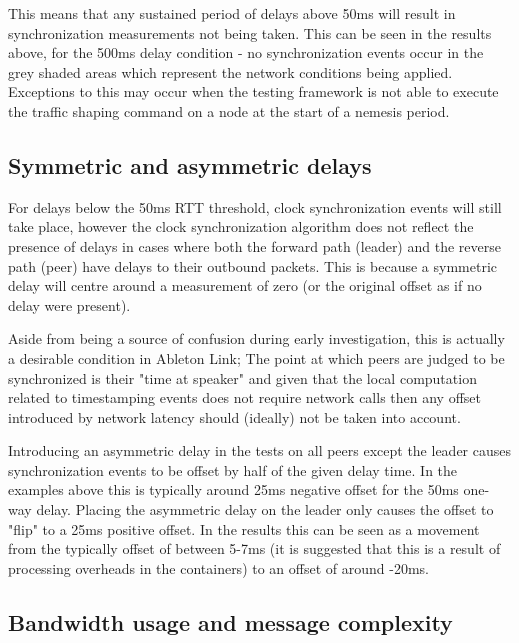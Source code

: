 \documentclass[11pt]{article} %
\theoremstyle{plain}
\theoremstyle{definition}
\begin{document}
This means that any sustained period of delays above 50ms will result in
synchronization measurements not being taken. This can be seen in the results
above, for the 500ms delay condition - no synchronization events occur in the
grey shaded areas which represent the network conditions being applied.
Exceptions to this may occur when the testing framework is not able to execute
the traffic shaping command on a node at the start of a nemesis period.

\subsection{Symmetric and asymmetric delays}

For delays below the 50ms RTT threshold, clock synchronization events will
still take place, however the clock synchronization algorithm does not reflect
the presence of delays in cases where both the forward path (leader) and
the reverse path (peer) have delays to their outbound packets. This is because
a symmetric delay will centre around a measurement of zero (or the original
offset as if no delay were present).


Aside from being a source of confusion during early investigation, this is
actually a desirable condition in Ableton Link; The point at which peers are
judged to be synchronized is their "time at speaker" and given that the local
computation related to timestamping events does not require network calls then
any offset introduced by network latency should (ideally) not be taken into
account.

Introducing an asymmetric delay in the tests on all peers except the leader
causes synchronization events to be offset by half of the given delay time. In
the examples above this is typically around 25ms negative offset for the 50ms
one-way delay. Placing the asymmetric delay on the leader only causes the
offset to "flip" to a 25ms positive offset. In the results this can be seen as
a movement from the typically offset of between 5-7ms (it is suggested that
this is a result of processing overheads in the containers) to an offset of
around -20ms.

\subsection{Bandwidth usage and message complexity}
\end{document}
